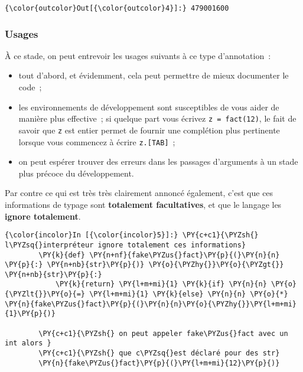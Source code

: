 \begin{Verbatim}[commandchars=\\\{\},frame=single,framerule=0.3mm,rulecolor=\color{cellframecolor}]
{\color{outcolor}Out[{\color{outcolor}4}]:} 479001600
\end{Verbatim}
            
    \hypertarget{usages}{%
\subsubsection{Usages}\label{usages}}

    À ce stade, on peut entrevoir les usages suivants à ce type
d'annotation~:

\begin{itemize}
\tightlist
\item
  tout d'abord, et évidemment, cela peut permettre de mieux documenter
  le code~;
\item
  les environnements de développement sont susceptibles de vous aider de
  manière plus effective~; si quelque part vous écrivez
  \texttt{z\ =\ fact(12)}, le fait de savoir que \texttt{z} est entier
  permet de fournir une complétion plus pertinente lorsque vous
  commencez à écrire \texttt{z.{[}TAB{]}}~;
\item
  on peut espérer trouver des erreurs dans les passages d'arguments à un
  stade plus précoce du développement.
\end{itemize}

    Par contre ce qui est très très clairement annoncé également, c'est que
ces informations de typage sont \textbf{totalement facultatives}, et que
le langage les \textbf{ignore totalement}.

    \begin{Verbatim}[commandchars=\\\{\},frame=single,framerule=0.3mm,rulecolor=\color{cellframecolor}]
{\color{incolor}In [{\color{incolor}5}]:} \PY{c+c1}{\PYZsh{} l\PYZsq{}interpréteur ignore totalement ces informations}
        \PY{k}{def} \PY{n+nf}{fake\PYZus{}fact}\PY{p}{(}\PY{n}{n} \PY{p}{:} \PY{n+nb}{str}\PY{p}{)} \PY{o}{\PYZhy{}}\PY{o}{\PYZgt{}} \PY{n+nb}{str}\PY{p}{:}
            \PY{k}{return} \PY{l+m+mi}{1} \PY{k}{if} \PY{n}{n} \PY{o}{\PYZlt{}}\PY{o}{=} \PY{l+m+mi}{1} \PY{k}{else} \PY{n}{n} \PY{o}{*} \PY{n}{fake\PYZus{}fact}\PY{p}{(}\PY{n}{n}\PY{o}{\PYZhy{}}\PY{l+m+mi}{1}\PY{p}{)}
        
        \PY{c+c1}{\PYZsh{} on peut appeler fake\PYZus{}fact avec un int alors }
        \PY{c+c1}{\PYZsh{} que c\PYZsq{}est déclaré pour des str}
        \PY{n}{fake\PYZus{}fact}\PY{p}{(}\PY{l+m+mi}{12}\PY{p}{)}
\end{Verbatim}


